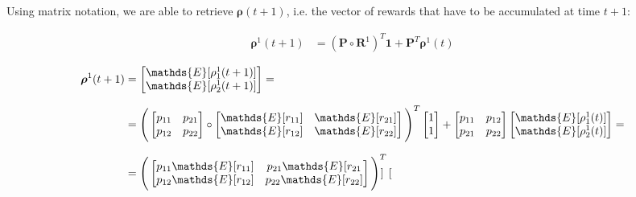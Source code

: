 \documentclass[\main/main.tex]{subfiles}
\begin{document}
Using matrix notation, we are able to retrieve $\bm{\rho}(t+1)$, i.e. the vector of rewards that have to be accumulated at time $t+1$:

\begin{equation}
\begin{split}
     \bm{\rho}^1(t+1) &= (\mathbf{P} \circ \mathbf{R}^1)^T \mathbf{1} + \mathbf{P}^T \bm{\rho}^1(t) 
\end{split}
\end{equation}

\begin{equation}
\setlength{\jot}{10pt}
\begin{split}
    \bm{\rho}^1(t+1) &= 
\begin{bmatrix}
      \mathds{E}[\rho_1^1(t+1)]\\
      \mathds{E}[\rho_2^1(t+1)]\\
\end{bmatrix}= \\
&= \Bigg(
\begin{bmatrix} 
 p_{11}& p_{21}\\
 p_{12}& p_{22}\\
 \end{bmatrix} \circ
 \begin{bmatrix} 
 \mathds{E}[r_{11}] &  \mathds{E}[r_{21}] \\
 \mathds{E}[r_{12}] &  \mathds{E}[r_{22}] \\
 \end{bmatrix}
 \Bigg) ^T
 \begin{bmatrix}
 1\\
 1\\
 \end{bmatrix}
 + 
 \begin{bmatrix} 
 p_{11}& p_{12}\\
 p_{21}& p_{22}\\
 \end{bmatrix}
 \begin{bmatrix}
      \mathds{E}[\rho_1^1(t)]\\
      \mathds{E}[\rho_2^1(t)]\\
\end{bmatrix}= \\
&= \Bigg( \begin{bmatrix} 
 p_{11}\mathds{E}[r_{11}] & p_{21}\mathds{E}[r_{21}\\
 p_{12}\mathds{E}[r_{12}]& 
 p_{22} \mathds{E}[r_{22}]\\
 \end{bmatrix}
  \Bigg) ^T
  \begin{bmatrix}

\end{bmatrix}
\end{split}
\end{equation}
\end{document}
